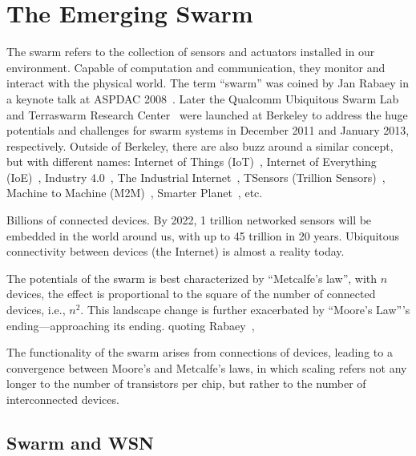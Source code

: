 \section{The Emerging Swarm}
\label{sec:emerging-swarm}

The swarm refers to the collection of sensors and actuators installed in our
environment. Capable of computation and communication, they monitor and interact
with the physical world. The term ``swarm'' was coined by Jan Rabaey in a
keynote talk at ASPDAC 2008~\cite{rabaey2008brand}. Later the Qualcomm
Ubiquitous Swarm Lab~\cite{swarmlab} and Terraswarm Research
Center~\cite{terraswarm} were launched at Berkeley to address the huge
potentials and challenges for swarm systems in December 2011 and January 2013,
respectively. Outside of Berkeley, there are also buzz around a similar concept,
but with different names: Internet of Things (IoT)~\cite{atzori2010internet},
Internet of Everything (IoE)~\cite{bradley2013internet}, Industry
4.0~\cite{lasi2014industry}, The Industrial
Internet~\cite{eigner2018industrial}, TSensors (Trillion
Sensors)~\cite{bogue2014towards}, Machine to Machine
(M2M)~\cite{anton2014machine}, Smarter Planet~\cite{palmisano2008smarter}, etc.

Billions of connected devices. By 2022, 1 trillion networked sensors will be
embedded in the world around us, with up to 45 trillion in 20 years. Ubiquitous
connectivity between devices (the Internet) is almost a reality today.

The potentials of the swarm is best characterized by ``Metcalfe's law'', with
$n$ devices, the effect is proportional to the square of the number of connected
devices, i.e., $n^2$. This landscape change is further exacerbated by ``Moore's
Law'''s ending---approaching its ending. quoting Rabaey~\cite{rabaey2011swarm},

\begin{displayquote}

  The functionality of the swarm arises from connections of devices, leading to
  a convergence between Moore's and Metcalfe's laws, in which scaling refers not
  any longer to the number of transistors per chip, but rather to the number of
  interconnected devices.

\end{displayquote}

\subsection{Swarm and WSN}
\label{sec:swarm-wsn}


